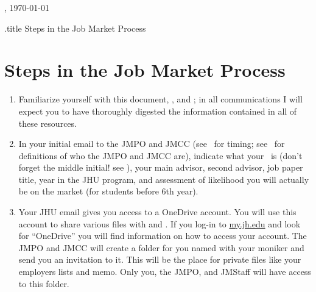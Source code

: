 \documentclass{\classes/econtex}
\begin{document}
\hfill{\tiny \jobname, \today} \vspace{0.1in}

\begin{verbatimwrite}{\jobname.title}
  Steps in the Job Market Process
\end{verbatimwrite}

\section*{\Large Steps in the Job Market Process}\medskip\medskip

\begin{enumerate}
\item Familiarize yourself with this document, \timet, and \faq; in all communications I will expect you
  to have thoroughly digested the information contained in all of these resources.

\item In your initial email to the JMPO and JMCC (see \timet~for timing; see \ntn~for definitions of who the JMPO and JMCC are), indicate what your \Moniker~is (don't forget the middle initial!  see \Notation), your main advisor, second advisor, job paper title,
  year in the JHU program, and assessment of likelihood you will
  actually be on the market (for students before 6th year).
  
  \hypertarget{OneDrive}{}
\item Your JHU email gives you access to a OneDrive account. You will use this account to share various files with {\JMStaff} and {\JMPO}. If you log-in to \href{https://my.jh.edu}{my.jh.edu} and look for ``OneDrive'' you will find information on how to access your account. The JMPO and JMCC will create a folder for you named with your moniker and send you an invitation to it. This will be the place for private files like your employers lists and memo. Only you, the JMPO, and JMStaff will have access to this folder.


\end{enumerate}
\end{document}
